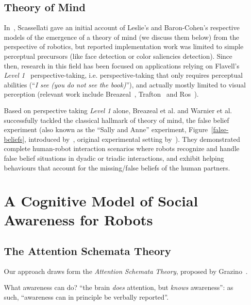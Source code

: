 \documentclass[a4paper]{article}
\newcommand{\etal}{et al.\xspace}
\newcommand{\ie}{i.e.\xspace}
\begin{document}
\subsection{Theory of Mind}

In~\cite{scassellati2002theory}, Scassellati gave
an initial account of Leslie's and Baron-Cohen's respective models of the
emergence of a theory of mind (we discuss them below) from the perspective of
robotics, but reported implementation work was limited to simple perceptual
precursors (like face detection or color saliencies detection). Since then,
research in this field has been focused on applications relying on Flavell's
\emph{Level 1}~\cite{flavell1977development} perspective-taking, \ie
perspective-taking that only requires perceptual abilities (``\emph{I see (you do
not see the book)}''), and actually mostly limited to visual perception (relevant
work include Breazeal~\cite{breazeal2006using}, Trafton~\cite{Trafton2005} and
Ros~\cite{Ros2010}).

Based on perspective taking \emph{Level 1} alone, Breazeal
\etal\cite{breazeal2009embodied} and Warnier \etal\cite{warnier2012when}
successfully tackled the classical hallmark of theory of mind, the false belief
experiment (also known as the ``Sally and Anne'' experiment,
Figure~\ref{false-beliefs}, introduced by~\cite{wimmer1983beliefs}, original
experimental setting by~\cite{baron1985does}). They demonstrated complete
human-robot interaction scenarios where robots recognize and handle false belief
situations in dyadic or triadic interactions, and exhibit helping behaviours
that account for the missing/false beliefs of the human partners.


\section{A Cognitive Model of Social Awareness for Robots}

\subsection{The Attention Schemata Theory}

Our approach draws form the \emph{Attention Schemata Theory}, proposed by
Grazino~\cite{graziano2013consciousness}.

What awareness can do? ``the brain \emph{does} attention, but \emph{knows}
awareness'': as such, ``awareness can in principle be verbally reported''.
\end{document}
